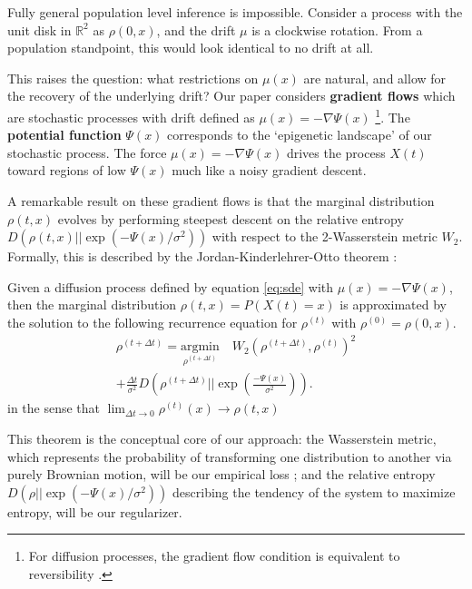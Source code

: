 \documentclass{article}
\begin{document}
Fully general population level inference is impossible. Consider a process with the unit disk in $\mathbb{R}^2$ as $\rho(0,x)$, and the drift $\mu$ is a clockwise rotation. From a population standpoint, this would look identical to no drift at all.

This raises the question: what restrictions on $\mu(x)$ are natural, and allow for the recovery of the underlying drift? Our paper considers \textbf{gradient flows} which are stochastic processes with drift defined as $\mu(x) = -\nabla \Psi(x)$ \footnote{For diffusion processes, the gradient flow condition is equivalent to reversibility \citep[Section 4.6]{pavliotis2014stochastic}.}. The \textbf{potential function} $\Psi(x)$ corresponds to the `epigenetic landscape' of our stochastic process. The force $\mu(x) = -\nabla \Psi(x)$ drives the process $X(t)$ toward regions of low $\Psi(x)$ much like a noisy gradient descent.

A remarkable result on these gradient flows is that the marginal distribution $\rho(t,x)$ evolves by performing steepest descent on the relative entropy $D(\rho(t,x) || \exp(-\Psi(x)/\sigma^2))$ with respect to the 2-Wasserstein metric $W_2$. Formally, this is described by the Jordan-Kinderlehrer-Otto theorem \citep{jordan1998variational}:

\begin{thm}\label{thm:jko}
Given a diffusion process defined by equation \ref{eq:sde} with $\mu(x) = -\nabla \Psi(x)$, then the marginal distribution $\rho(t,x)=P(X(t)=x)$ is approximated by the solution to the following recurrence equation for $\rho^{(t)}$ with $\rho^{(0)}=\rho(0,x)$.
\begin{multline}
\rho^{(t+\Delta t)} = \underset{\rho^{(t+\Delta t)}}{\text{argmin}} \quad W_2(\rho^{(t+\Delta t)}, \rho^{(t)})^2 \\
+ \frac{\Delta t}{\sigma^2}D\left(\rho^{(t+\Delta t)}||\exp\left(\frac{-\Psi(x)}{\sigma^2}\right)\right).
\end{multline}
in the sense that $\lim_{\Delta t \to 0} \rho^{(t)}(x) \to \rho(t,x)$
\end{thm}

This theorem is the conceptual core of our approach: the Wasserstein metric, which represents the probability of transforming one distribution to another via purely Brownian motion, will be our empirical loss \citep{adams2013large}; and the relative entropy $D(\rho||\exp(-\Psi(x)/\sigma^2))$ describing the tendency of the system to maximize entropy, will be our regularizer.
\end{document}

